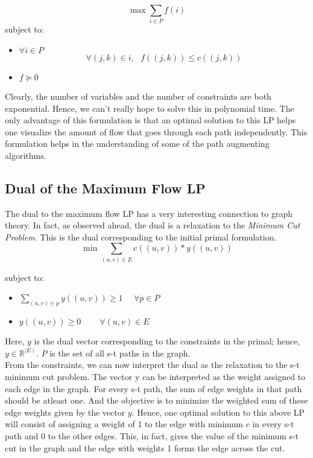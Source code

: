 \documentclass[BTech]{iitmdiss}
\begin{document}
	  
	  $$ \max \displaystyle\sum_{i \in P} f(i) $$
	  subject to:
	  
	  \begin{itemize}
	   \item 
	      $\forall i \in P$
	      $$\forall (j,k) \in i,~~~f((j,k)) \leq c((j,k))$$
	   
	   \item
	      $f \succeq 0$
	  \end{itemize}
	  
	  
	  
	  Clearly, the number of variables and the number of constraints are both exponential. Hence, we can't really hope to solve this in polynomial
	  time. The only advantage of this formulation is that an optimal solution to this LP helps one visualize the amount of flow that goes through
	  each path independently. This formulation helps in the understanding of some of the path augmenting algorithms.
	
	\subsection{Dual of the Maximum Flow LP}
	  The dual to the maximum flow LP has a very interesting connection to graph theory. In fact, as observed ahead, the dual is a relaxation 
	  to the \textit{Minimum Cut Problem}. This is the dual corresponding to the initial primal formulation.\\
	  
	  $$\min \displaystyle\sum_{(u,v) \in E} c((u,v)) \ast y((u,v))$$
	  
	  subject to:
	  \begin{itemize}
	   \item 
	    $\displaystyle \sum_{(u,v) \in p} y((u,v)) \geq 1~~~~~~\forall p \in P$
	   \item
	    $y((u,v)) \geq 0 ~~~~~~~~~~ \forall (u,v) \in E$
	   
	  \end{itemize}

	  Here, $y$ is the dual vector corresponding to the constraints in the primal; hence, $y \in \mathbb{R}^{\mid E\mid }$.  $P$ is the set of all
	  s-t paths in the graph. \\
	  
	  From the constraints, we can now interpret the dual as the relaxation to the s-t minimum cut problem. The vector y can be interpreted 
	  as the weight assigned to each edge in the graph. For every s-t path, the sum of edge weights in that path should be atleast one. And the 
	  objective is to minimize the weighted sum of these edge weights given by the vector $y$. Hence, one optimal solution to this above LP
	  will consist of assigning a weight of 1 to the edge with minimum $c$ in every s-t path and 0 to the other edges. This, in fact, gives the 
	  value of the minimum s-t cut in the graph and the edge with weights 1 forms the edge across the cut. \\
	  
\end{document}
